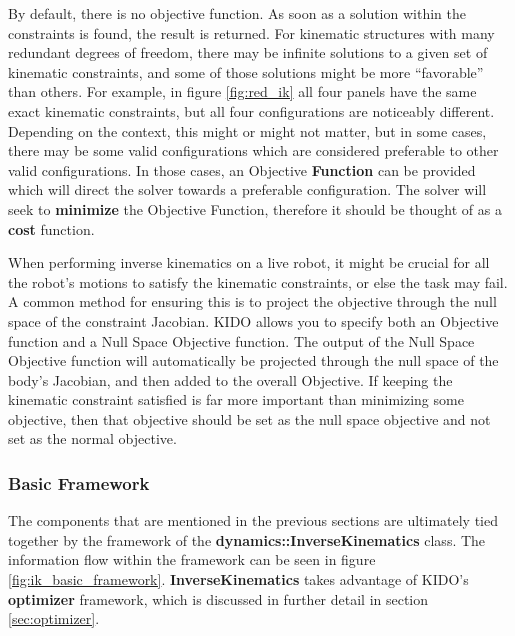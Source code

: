 By default, there is no objective function. As soon as a solution within the constraints is found, the result is returned. For kinematic structures with many redundant degrees of freedom, there may be infinite solutions to a given set of kinematic constraints, and some of those solutions might be more ``favorable'' than others. For example, in figure \ref{fig:red_ik} all four panels have the same exact kinematic constraints, but all four configurations are noticeably different. Depending on the context, this might or might not matter, but in some cases, there may be some valid configurations which are considered preferable to other valid configurations. In those cases, an Objective \textbf{Function} can be provided which will direct the solver towards a preferable configuration. The solver will seek to \textbf{minimize} the Objective Function, therefore it should be thought of as a \textbf{cost} function.

When performing inverse kinematics on a live robot, it might be crucial for all the robot's motions to satisfy the kinematic constraints, or else the task may fail. A common method for ensuring this is to project the objective through the null space of the constraint Jacobian. KIDO allows you to specify both an Objective function and a Null Space Objective function. The output of the Null Space Objective function will automatically be projected through the null space of the body's Jacobian, and then added to the overall Objective. If keeping the kinematic constraint satisfied is far more important than minimizing some objective, then that objective should be set as the null space objective and not set as the normal objective.

\subsubsection{Basic Framework}
\label{sec:ik_basic_framework}
The components that are mentioned in the previous sections are ultimately tied together by the framework of the \textbf{dynamics::InverseKinematics} class. The information flow within the framework can be seen in figure \ref{fig:ik_basic_framework}. \textbf{InverseKinematics} takes advantage of KIDO's \textbf{optimizer} framework, which is discussed in further detail in section \ref{sec:optimizer}.

